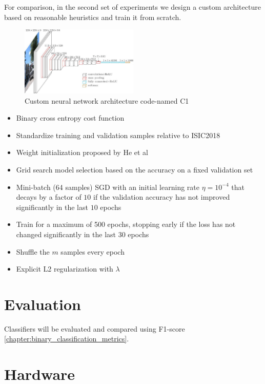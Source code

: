 For comparison, in the second set of experiments we design a custom architecture based on reasonable heuristics and train it from scratch.

\begin{figure}[h]
    \centering
    \includegraphics[width=0.5\textwidth]{figs/vgg16.jpg}
    \caption{Custom neural network architecture code-named C1}
    \label{fig:c1}
\end{figure}

\begin{itemize}
    \item Binary cross entropy cost function
    \item Standardize training and validation samples relative to ISIC2018
    \item Weight initialization proposed by He et al \cite{HeWeightInit}
    \item Grid search model selection based on the accuracy on a fixed validation set
    \item Mini-batch (64 samples) \ac{SGD} with an initial learning rate $\eta = 10^{-4}$ that decays by a factor of $10$ if the validation accuracy has not improved significantly in the last $10$ epochs
    \item Train for a maximum of 500 epochs, stopping early if the loss has not changed significantly in the last $30$ epochs
    \item Shuffle the $m$ samples every epoch
    \item Explicit L2 regularization with $\lambda$
\end{itemize}

\section{Evaluation}

Classifiers will be evaluated and compared using F1-score \ref{chapter:binary_classification_metrics}.

\section{Hardware}

